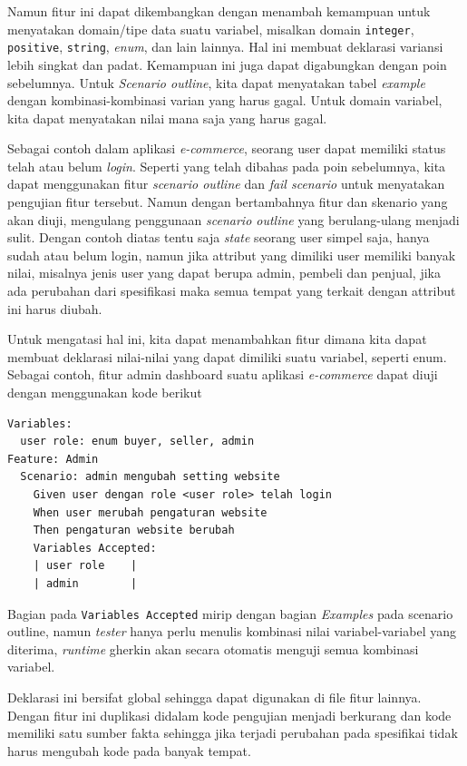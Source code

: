 Namun fitur ini dapat dikembangkan dengan menambah kemampuan untuk menyatakan domain/tipe data suatu variabel, misalkan
domain \texttt{integer}, \texttt{positive}, \texttt{string}, \emph{enum}, dan lain lainnya.
Hal ini membuat deklarasi variansi lebih singkat dan padat.
Kemampuan ini juga dapat digabungkan dengan poin sebelumnya.
Untuk \emph{Scenario outline}, kita dapat menyatakan tabel \emph{example} dengan
kombinasi-kombinasi varian yang harus gagal.
Untuk domain variabel, kita dapat menyatakan nilai mana saja yang harus gagal.

Sebagai contoh dalam aplikasi \emph{e-commerce}, seorang user dapat memiliki status
telah atau belum \emph{login}. Seperti yang telah dibahas pada poin sebelumnya, kita dapat
menggunakan fitur \emph{scenario outline} dan \emph{fail scenario} untuk menyatakan
pengujian fitur tersebut. Namun dengan bertambahnya fitur dan skenario yang akan diuji,
mengulang penggunaan \emph{scenario outline} yang berulang-ulang menjadi sulit. Dengan contoh
diatas tentu saja \emph{state} seorang user simpel saja, hanya sudah atau belum login, namun
jika attribut yang dimiliki user memiliki banyak nilai, misalnya jenis user yang dapat
berupa admin, pembeli dan penjual, jika ada perubahan dari spesifikasi maka semua tempat
yang terkait dengan attribut ini harus diubah.

Untuk mengatasi hal ini, kita dapat menambahkan fitur dimana kita dapat membuat deklarasi
nilai-nilai yang dapat dimiliki suatu variabel, seperti enum. Sebagai contoh, fitur admin
dashboard suatu aplikasi \emph{e-commerce} dapat diuji dengan menggunakan kode berikut

\begin{lstlisting}[language=gherkin]
Variables:
  user role: enum buyer, seller, admin
Feature: Admin
  Scenario: admin mengubah setting website
    Given user dengan role <user role> telah login
    When user merubah pengaturan website
    Then pengaturan website berubah
    Variables Accepted:
    | user role    |
    | admin        |
\end{lstlisting}

Bagian pada \texttt{Variables Accepted} mirip dengan bagian \emph{Examples} pada
scenario outline, namun \emph{tester} hanya perlu menulis kombinasi nilai variabel-variabel
yang diterima, \emph{runtime} gherkin akan secara otomatis menguji semua kombinasi variabel.

Deklarasi ini bersifat global sehingga dapat digunakan di file fitur lainnya.
Dengan fitur ini duplikasi didalam kode pengujian menjadi berkurang dan
kode memiliki satu sumber fakta sehingga jika terjadi perubahan pada spesifikai tidak
harus mengubah kode pada banyak tempat.

